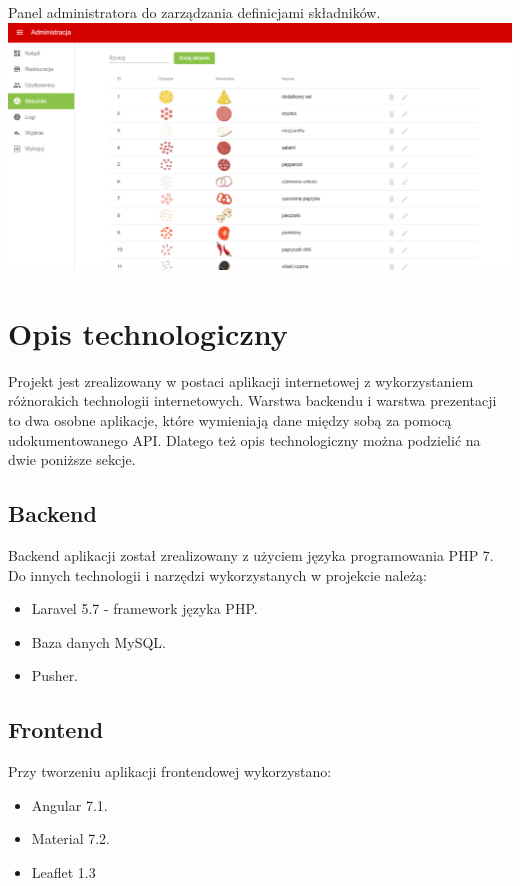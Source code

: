 \documentclass[12pt]{article}
\begin{document}
\clearpage

Panel administratora do zarządzania definicjami składników. \\

\includegraphics[width=16cm]{admin}

\clearpage
\vspace{1cm}
\section{Opis technologiczny}
\vspace{1cm}
Projekt jest zrealizowany w postaci aplikacji internetowej z wykorzystaniem różnorakich technologii internetowych.
Warstwa backendu i warstwa prezentacji to dwa osobne aplikacje, które wymieniają dane między sobą za pomocą udokumentowanego API. Dlatego też opis technologiczny można podzielić na dwie poniższe sekcje.

\subsection{Backend}

Backend aplikacji został zrealizowany z użyciem języka programowania PHP 7. Do innych technologii i narzędzi wykorzystanych w projekcie należą:
\begin{itemize}
	\item Laravel 5.7 - framework języka PHP.
	\item Baza danych MySQL.
	\item Pusher.
\end{itemize}

\subsection{Frontend}

Przy tworzeniu aplikacji frontendowej wykorzystano:
\begin{itemize}
	\item Angular 7.1.
	\item Material 7.2.
	\item Leaflet 1.3
\end{itemize}
\end{document}
